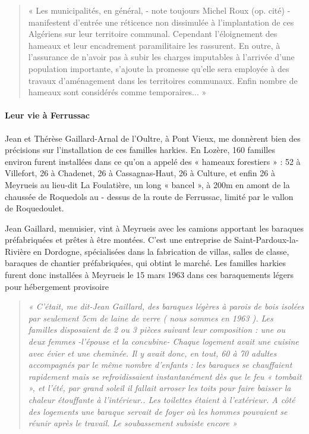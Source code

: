 \begin{quote}
« Les municipalités, en général, - note toujours Michel Roux (op. cité) - manifestent
d’entrée une réticence non dissimulée à l’implantation de ces Algériens sur leur
territoire communal. Cependant l’éloignement des hameaux et leur encadrement
paramilitaire les rassurent. En outre, à l’assurance de n’avoir pas à subir les charges
imputables à l’arrivée d’une population importante, s’ajoute la promesse qu’elle sera
employée à des travaux d’aménagement dans les territoires communaux. Enfin
nombre de hameaux sont considérés comme temporaires... »
\end{quote}

\paragraph{Leur vie à Ferrussac}

Jean et Thérèse Gaillard-Arnal de l’Oultre, à Pont Vieux, me donnèrent bien des
précisions sur l’installation de ces familles harkies. En Lozère, 160 familles environ
furent installées dans ce qu’on a appelé des « hameaux forestiers » : 52 à Villefort, 26
à Chadenet, 26 à Cassagnas-Haut, 26 à Culture, et enfin 26 à Meyrueis au lieu-dit La
Foulatière, un long « bancel », à 200m en amont de la chaussée de Roquedols au -
dessus de la route de Ferrussac, limité par le vallon de Roquedoulet.

Jean Gaillard, menuisier, vint à Meyrueis avec les camions apportant les baraques
préfabriquées et prêtes à être montées. C’est une entreprise de Saint-Pardoux-la-
Rivière en Dordogne, spécialisées dans la fabrication de villas, salles de classe,
baraques de chantier préfabriquées, qui obtint le marché.
Les familles harkies furent donc installées à Meyrueis le 15 mars 1963 dans ces
baraquements légers pour hébergement provisoire

\begin{quote}
\textit{« C’était, me dit-Jean Gaillard, des baraques légères à parois de bois isolées par
seulement 5cm de laine de verre ( nous sommes en 1963 ). Les familles disposaient de
2 ou 3 pièces suivant leur composition : une ou deux femmes -l’épouse et la
concubine- Chaque logement avait une cuisine avec évier et une cheminée. Il y avait
donc, en tout, 60 à 70 adultes accompagnés par le même nombre d’enfants : les
baraques se chauffaient rapidement mais se refroidissaient instantanément dès que le
feu « tombait », et l’été, par grand soleil il fallait arroser les toits pour faire baisser
la chaleur étouffante à l’intérieur.. Les toilettes étaient à l’extérieur. A côté des
logements une baraque servait de foyer où les hommes pouvaient se réunir après le
travail. Le soubassement subsiste encore »}
\end{quote}

